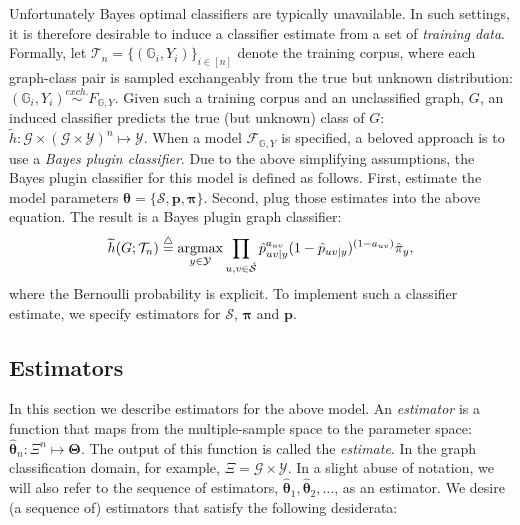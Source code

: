 \documentclass[10pt,journal,cspaper,compsoc]{IEEEtran}
\providecommand{\ve}[1]{\boldsymbol{#1}}
\newcommand{\argmax}{\operatornamewithlimits{argmax}}
\newcommand{\GG}{\mathbb{G}}
\newcommand{\bth}{\ve{\theta}}
\newcommand{\bhth}{\mh{\ve{\theta}}}
\newcommand{\bTh}{\ve{\Theta}}
\providecommand{\mc}[1]{\mathcal{#1}}
\providecommand{\mb}[1]{\boldsymbol{#1}}
\providecommand{\mh}[1]{\hat{#1}}
\providecommand{\mt}[1]{\widetilde{#1}}
\providecommand{\mhc}[1]{\hat{\mathcal{#1}}}
\newcommand{\defeq}{\overset{\triangle}{=}}
\begin{document}
Unfortunately Bayes optimal classifiers are typically unavailable. In such settings, it is therefore desirable to induce a classifier estimate from a set of \emph{training data}. Formally, let $\mc{T}_n= \{(\GG_i,Y_i)\}_{i \in [n]}$ denote the training corpus, where each graph-class pair is sampled exchangeably from the true but unknown distribution: $(\GG_i,Y_i) \overset{exch.}{\sim} F_{\GG, Y}$.  Given such a training corpus and an unclassified graph, $G$, an induced classifier predicts the true (but unknown) class of $G$: $\mt{h}: \mc{G} \times (\mc{G} \times \mc{Y})^n \mapsto \mc{Y}$.  When a model $\mc{F}_{\GG,Y}$ is specified, a beloved approach is to use a  \emph{Bayes plugin classifier}. Due to the above simplifying assumptions, the Bayes plugin classifier for this model is defined as follows.  First, estimate the  model parameters $\bth=\{\mc{S}, \mb{p}, \mb{\pi}\}$. Second, plug those estimates into the above equation.  The result is a Bayes plugin graph classifier:
\begin{align}
\mt{h}(G; \mc{T}_n) \defeq  \argmax_{y \in \mc{Y}} \prod_{u,v \in \mhc{S}}
\mh{p}_{uv|y}^{a_{uv}}(1-\mh{p}_{uv|y})^{(1-a_{uv})} \mh{\pi}_y,
\end{align}
where the Bernoulli probability is explicit. To implement such a classifier estimate, we specify estimators for $\mc{S}$, $\mb{\pi}$ and $\mb{p}$.


\subsection{Estimators} %
\label{sub:estimators}


In this section we describe estimators for the above model.  An \emph{estimator} is a function that maps from the multiple-sample space to the parameter space: $\bhth_n: \Xi^n \mapsto \bTh$. The output of this function is called the \emph{estimate}.  In the graph classification domain, for example, $\Xi=\mc{G} \times \mc{Y}$.  In a slight abuse of notation, we will also refer to the sequence of estimators, $\bhth_1,\bhth_2, \ldots$, as an estimator.  We desire (a sequence of) estimators that satisfy the following desiderata:
\end{document}
